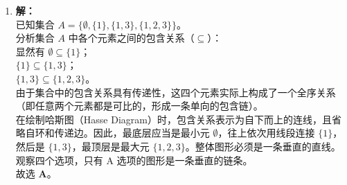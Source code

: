 \begin{enumerate}
	\textbf{D 选项}：$n^n$ 是从集合 $A$ 映射到集合 $A$ 的所有可能函数的个数。由于每一个函数也是一种特殊的二元关系，所以 $n^n$ 只是关系的一部分，并不是所有二元关系的总数。此选项错误。
	
	\textbf{正确答案：B}

	\item \textbf{解：}\\
	已知集合 $A = \{\emptyset, \{1\}, \{1, 3\}, \{1, 2, 3\}\}$。\\
	分析集合 $A$ 中各个元素之间的包含关系（$\subseteq$）：\\
	显然有 $\emptyset \subseteq \{1\}$；\\
	$\{1\} \subseteq \{1, 3\}$；\\
	$\{1, 3\} \subseteq \{1, 2, 3\}$。\\
	由于集合中的包含关系具有传递性，这四个元素实际上构成了一个全序关系（即任意两个元素都是可比的，形成一条单向的包含链）。\\
	在绘制哈斯图（Hasse Diagram）时，包含关系表示为自下而上的连线，且省略自环和传递边。因此，最底层应当是最小元 $\emptyset$，往上依次用线段连接 $\{1\}$，然后是 $\{1, 3\}$，最顶层是最大元 $\{1, 2, 3\}$。整体图形必须是一条垂直的直线。\\
	观察四个选项，只有 A 选项的图形是一条垂直的链条。\\
	故选 \textbf{A}。
	
	\vspace{1em}
	

\end{enumerate}
